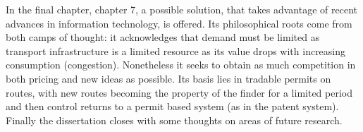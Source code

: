 In the final chapter, chapter 7, a possible solution, that takes advantage of recent advances in information technology, is offered. Its philosophical roots come from both camps of thought: it acknowledges that demand must be limited as transport infrastructure is a limited resource as its value drops with increasing consumption (congestion). Nonetheless it seeks to obtain as much competition in both pricing and new ideas as possible. Its basis lies in tradable permits on routes, with new routes becoming the property of the finder for a limited period and then control returns to a permit based system (as in the patent system). Finally the dissertation closes with some thoughts on areas of future research.